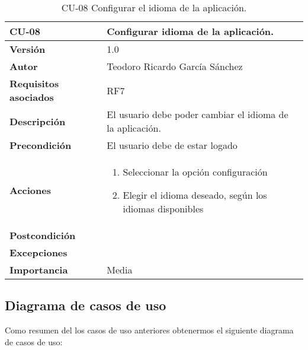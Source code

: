 \begin{table}[p]
	\centering
	\begin{tabularx}{\linewidth}{ p{} p{} }
		\toprule
		\textbf{CU-08}    & \textbf{Configurar idioma de la aplicación.}\\
		\toprule
		\textbf{Versión}              & 1.0    \\
		\textbf{Autor}                & Teodoro Ricardo García Sánchez \\
		\textbf{Requisitos asociados} & RF7 \\
		\textbf{Descripción}          & El usuario debe poder cambiar el idioma de la aplicación.  \\
		\textbf{Precondición}         & El usuario debe de estar logado \\
		\textbf{Acciones}             &
		\begin{enumerate}
			\def\labelenumi{\arabic{enumi}.}
			\tightlist
			\item Seleccionar la opción configuración
			\item Elegir el idioma deseado, según los idiomas disponibles
		\end{enumerate}\\
		\textbf{Postcondición}        &  \\
		\textbf{Excepciones}          &  \\
		\textbf{Importancia}          & Media \\
		\bottomrule
	\end{tabularx}
	\caption{CU-08 Configurar el idioma de la aplicación.}
\end{table}

\subsection{Diagrama de casos de uso}

Como resumen del los casos de uso anteriores obtenermos el siguiente diagrama de casos de uso:




